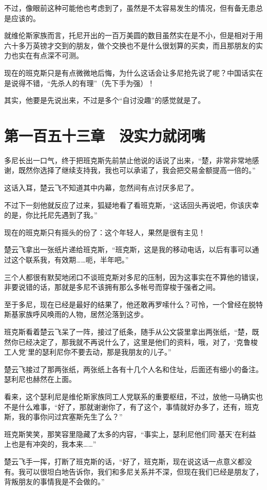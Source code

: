 不过，像眼前这种可能他也考虑到了，虽然是不太容易发生的情况，但有备无患总是应该的。

就维伦斯家族而言，托尼开出的一百万美圆的数目虽然实在是不小，但是相对于用六十多万英镑才交到的朋友，做个交换也不是什么很划算的买卖，而且那朋友的实力也实在有点深不可测。

现在的班克斯只是有点微微地后悔，为什么这话会让多尼抢先说了呢？中国话实在是说得不错，“先杀人的有理”（先下手为强）！

其实，他要是先说出来，不过是多个“自讨没趣”的感觉就是了。

\section{第一百五十三章　没实力就闭嘴}

多尼长出一口气，终于把班克斯先前禁止他说的话说了出来，“楚，非常非常地感谢，既然你选择了继续支持我，我也可以承诺了，我会把交易金额提高一倍的。”

这话入耳，楚云飞不知道其中内幕，忽然间有点讨厌多尼了。

不过下一刻他就反应了过来，狐疑地看了看班克斯，“这话回头再说吧，你该庆幸的是，你比托尼先遇到了我。”

现在的班克斯只有摇头的份了：这个年轻人，果然是很有主见！

楚云飞拿出一张纸片递给班克斯，“班克斯，这是我的移动电话，以后有事可以通过这个联系我，有效期……呃，半年吧。”

三个人都很有默契地闭口不谈班克斯对多尼的压制，因为这事实在不算他的错误，非要说错的话，那就是多尼不该拥有那么多帐号而穿梭于强者之间。

至于多尼，现在已经是最好的结果了，他还敢再罗嗦什么？可怜，一个曾经在脱特斯基家族呼风唤雨的人物，居然沦落到这步。

班克斯看着楚云飞呆了一阵，接过了纸条，随手从公文袋里拿出两张纸，“楚，既然你已经决定了，那我就不再说什么了，这里是他们的资料，哦，对了，‘克鲁梭工人党’里的瑟利尼你不要去动，那是我朋友的儿子。”

楚云飞接过了那两张纸，两张纸上各有十几个人名和住址，后面还有细小的备注。瑟利尼也赫然在上面。

看来，这个瑟利尼是维伦斯家族同工人党联系的重要枢纽，不过，放他一马确实也不是什么难事，“好了，那就谢谢你了，有了这个，事情就好办多了，还有，班克斯，我的事你问过宾塞斯先生了么？”

班克斯笑笑，那笑容里隐藏了太多的内容，“事实上，瑟利尼他们同‘基天’在利益上也是有冲突的，我本来……”

楚云飞手一挥，打断了班克斯的话，“好了，班克斯，现在说这话一点意义都没有。我可以很坦白地告诉你，我们和多尼关系并不深，但现在我们已经是朋友了，背叛朋友的事情我是不会做的。”


